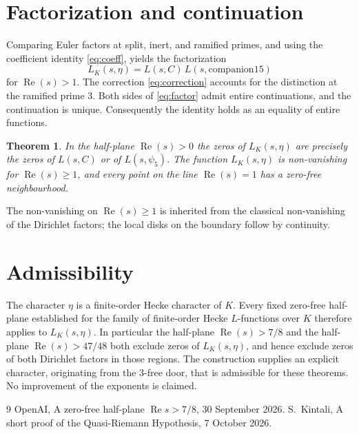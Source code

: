 \documentclass[11pt,a4paper]{article}
\newtheorem{theorem}{Theorem}
\begin{document}
\section{Factorization and continuation}

Comparing Euler factors at split, inert, and ramified primes, and using the coefficient identity \eqref{eq:coeff}, yields the factorization
\begin{equation}
\label{eq:factor}
L_K(s,\eta)=L(s,C)\,L(s,\mathrm{companion15})
\end{equation}
for \(\operatorname{Re}(s)>1\). The correction \eqref{eq:correction} accounts for the distinction at the ramified prime \(3\). Both sides of \eqref{eq:factor} admit entire continuations, and the continuation is unique. Consequently the identity holds as an equality of entire functions.

\begin{theorem}
In the half-plane \(\operatorname{Re}(s)>0\) the zeros of \(L_K(s,\eta)\) are precisely the zeros of \(L(s,C)\) or of \(L(s,\psi_5)\). The function \(L_K(s,\eta)\) is non-vanishing for \(\operatorname{Re}(s)\ge 1\), and every point on the line \(\operatorname{Re}(s)=1\) has a zero-free neighbourhood.
\end{theorem}

The non-vanishing on \(\operatorname{Re}(s)\ge 1\) is inherited from the classical non-vanishing of the Dirichlet factors; the local disks on the boundary follow by continuity.

\section{Admissibility}

The character \(\eta\) is a finite-order Hecke character of \(K\). Every fixed zero-free half-plane established for the family of finite-order Hecke \(L\)-functions over \(K\) therefore applies to \(L_K(s,\eta)\). In particular the half-plane \(\operatorname{Re}(s)>7/8\) and the half-plane \(\operatorname{Re}(s)>47/48\) both exclude zeros of \(L_K(s,\eta)\), and hence exclude zeros of both Dirichlet factors in those regions. The construction supplies an explicit character, originating from the 3-free door, that is admissible for these theorems. No improvement of the exponents is claimed.

\begin{thebibliography}{9}
OpenAI, A zero-free half-plane \(\operatorname{Re}s>7/8\), 30 September 2026.
S.~Kintali, A short proof of the Quasi-Riemann Hypothesis, 7 October 2026.
\end{thebibliography}
\end{document}
